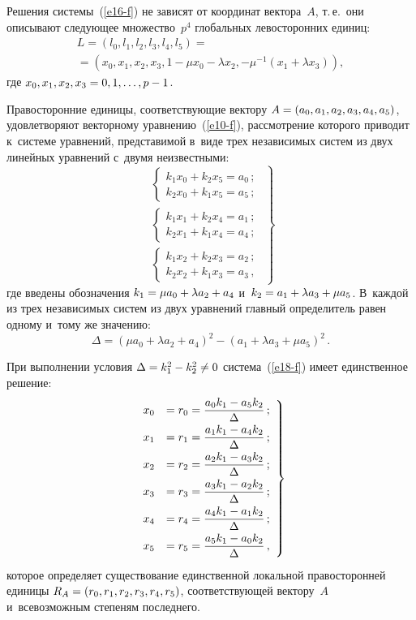 \begin{multicols}{2}
  Решения системы~(\ref{e16-f}) не зависят от координат вектора~$A$, т.\,е.\ 
они описывают следующее множество~$p^4$ глобальных левосторонних 
единиц:
  \begin{multline}
  L=\left( l_0, l_1, l_2, l_3, l_4, l_5\right)={}\\
  \!\!\!=\left( x_0, x_1, x_2, x_3, 1\!-\!\mu x_0\!-\!
\lambda x_2, -\mu^{-1}(x_1\!+\!\lambda x_3)\right),\!\!\!\!
  \label{e17-f}
  \end{multline}
где $x_0, x_1, x_2, x_3 \hm=0, 1, \ldots ,  p-1$.
  
  Правосторонние единицы, соответствующие вектору $A\hm= (a_0, a_1, a_2, 
a_3, a_4, a_5)$, удовлетворяют векторному уравнению~(\ref{e10-f}), 
рассмотрение которого приводит к~системе уравнений, представимой
в~виде трех независимых систем из двух линейных уравнений с~двумя 
неизвестными:
\begin{equation}
\left.
\begin{array}{l}
\left\{
\begin{array}{l}
k_1x_0+k_2x_5=a_0\,;\\[3pt]
k_2x_0+k_1x_5=a_5\,;
\end{array}
\right.\\[12pt]
\left\{
\begin{array}{l}
k_1x_1+k_2x_4=a_1\,;\\[3pt]
k_2x_1+k_1x_4=a_4\,;
\end{array}
\right.\\[12pt]
\left\{
\begin{array}{l}
k_1x_2+k_2x_3=a_2\,;\\[6pt]
k_2x_2+k_1x_3=a_3\,,
\end{array}
\right.
\end{array}
\right\}
\label{e18-f}
\end{equation}
%     
где введены обозначения $k_1\hm= \mu a_0\hm+\lambda a_2\hm+a_4$ 
и~$k_2\hm= a_1\hm+\lambda a_3 \hm+\mu a_5$. В~каждой из трех независимых 
систем из двух уравнений главный определитель равен одному и~тому же 
значению: 
$$
\Delta =\left( \mu a_0+\lambda a_2+a_4\right)^2-\left( a_1+\lambda a_3+\mu 
a_5\right)^2\,.
$$
  
  При выполнении условия $\Delta\hm= k_1^2\hm- k_2^2\not= 0$ 
сис\-те\-ма~(\ref{e18-f}) имеет единственное решение:
\begin{equation}
\left.
\begin{array}{rl}
x_0&=r_0=\displaystyle\frac{\displaystyle a_0k_1-a_5k_2\mathstrut}{\displaystyle \Delta\mathstrut}\,;\\[6pt]
x_1&=r_1= \displaystyle\frac{\displaystyle a_1k_1-a_4k_2\mathstrut}{\displaystyle \Delta\mathstrut}\,;\\[6pt]
x_2&=r_2=\displaystyle\frac{\displaystyle a_2k_1-a_3k_2\mathstrut}{\displaystyle \Delta\mathstrut}\,;\\[6pt]
x_3&=r_3=\displaystyle\frac{\displaystyle a_3k_1-a_2k_2\mathstrut}{\displaystyle \Delta\mathstrut}\,;\\[6pt]
x_4&=r_4=\displaystyle\frac{\displaystyle a_4k_1-a_1k_2\mathstrut}{\displaystyle \Delta\mathstrut}\,;\\[6pt]
x_5&=r_5=\displaystyle\frac{\displaystyle a_5k_1-a_0k_2\mathstrut}{\displaystyle \Delta\mathstrut}\,,
\end{array}
\right\}
\label{e19-f}
\end{equation}
которое определяет существование единственной локальной правосторонней 
единицы $R_A\hm= (r_0, r_1, r_2, r_3, r_4, r_5)$, соответствующей вектору~$A$ 
и~всевозможным степеням последнего. 


\end{multicols}
